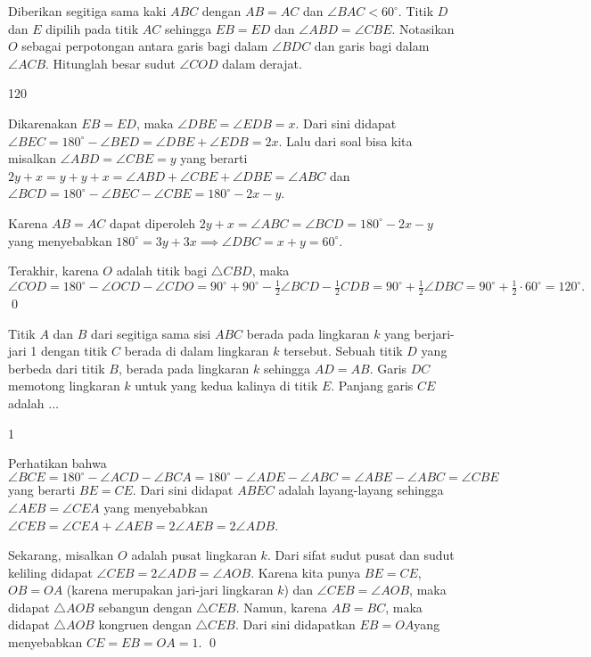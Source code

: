 \documentclass[11pt]{scrartcl}
\begin{document}
	\begin{soalbaru}
		Diberikan segitiga sama kaki $ABC$ dengan $AB = AC$ dan $\angle BAC < 60^\circ$. Titik $D$ dan $E$ dipilih pada titik $AC$ sehingga $EB = ED$ dan $\angle ABD = \angle CBE$. Notasikan $O$ sebagai perpotongan antara garis bagi dalam $\angle BDC$ dan garis bagi dalam $\angle ACB$. Hitunglah besar sudut $\angle COD$ dalam derajat. %
		\begin{jawaban}
		120
		\end{jawaban}
		\begin{solusi}
		Dikarenakan $EB=ED$, maka $\angle DBE =\angle EDB = x$. Dari sini didapat $\angle BEC = 180^\circ - \angle BED = \angle DBE + \angle EDB = 2x.$ Lalu dari soal bisa kita misalkan $\angle ABD = \angle CBE = y$ yang berarti  $2y+x=y+y+x=\angle ABD + \angle CBE + \angle DBE = \angle ABC$ dan $\angle BCD = 180^\circ - \angle BEC - \angle CBE = 180^\circ -2x-y$. 
		
		Karena $AB=AC$ dapat diperoleh $2y+x= \angle ABC=\angle BCD= 180^\circ -2x-y$ yang menyebabkan $180^\circ = 3y + 3x \implies \angle DBC = x+ y=60^\circ.$ 
		
		Terakhir, karena $O$ adalah titik bagi $\triangle CBD$, maka $\angle COD = 180^\circ - \angle OCD - \angle CDO = 90^\circ + 90^\circ - \frac{1}{2}\angle BCD - \frac{1}{2} CDB = 90^\circ + \frac{1}{2}\angle DBC = 90^\circ + \frac{1}{2}\cdot 60^\circ = 120^\circ.$ \qed
		\end{solusi}
	\end{soalbaru}
	
	\begin{soalbaru}
		Titik $A$ dan $B$ dari segitiga sama sisi $ABC$ berada pada lingkaran $k$ yang berjari-jari 1 dengan titik $C$ berada di dalam lingkaran $k$ tersebut. Sebuah titik $D$ yang berbeda dari titik $B$, berada pada lingkaran $k$ sehingga $AD=AB$. Garis $DC$ memotong lingkaran $k$ untuk yang kedua kalinya di titik $E$. Panjang garis $CE$ adalah $\dots$ %
		\begin{jawaban}
		1
		\end{jawaban}
		\begin{solusi}
		Perhatikan bahwa $\angle BCE = 180^\circ  - \angle ACD - \angle BCA = 180^\circ  - \angle ADE -\angle ABC = \angle ABE - \angle ABC = \angle CBE$ yang berarti $BE = CE$. Dari sini didapat $ABEC$ adalah layang-layang sehingga $\angle AEB = \angle CEA$ yang menyebabkan $\angle CEB = \angle CEA + \angle AEB= 2\angle AEB = 2\angle ADB$.
		
		Sekarang, misalkan $O$ adalah pusat lingkaran $k$. Dari sifat sudut pusat dan sudut keliling didapat $ \angle CEB= 2\angle ADB = \angle AOB$. Karena kita punya $BE=CE$, $OB = OA$ (karena merupakan jari-jari lingkaran $k$) dan $\angle CEB = \angle AOB$, maka didapat $\triangle AOB$ sebangun dengan $\triangle CEB$. Namun, karena $AB=BC$, maka didapat $\triangle AOB$ kongruen dengan $\triangle CEB$. Dari sini didapatkan $EB = OA$yang menyebabkan $CE = EB = OA = 1$. \qed
		\end{solusi}
	\end{soalbaru}
\end{document}
